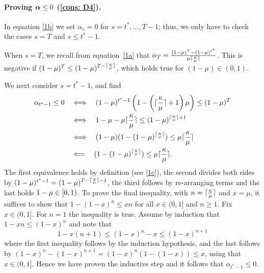 \paragraph{Proving $\bm{\alpha} \leq 0$ (\ref{cons: D4}).}
In  equation \eqref{1b} we set $\alpha_s = 0$ for $s = t^*, \ldots, T-1$; thus, we only have to check the cases $s = T$ and $s\leq t^*-1$. 

When $s=T$, we recall from equation~\eqref{1a} that $\alpha_T =  \frac{ (1-\mu)^T - (1-\mu)^{t^*} }{\mu \lceil \frac{\kappa}{\mu}\rceil}$. This is negative if $(1-\mu)^T \leq (1-\mu)^{T - \lceil \frac{\kappa}{\mu} \rceil}$, which holds true for $(1-\mu)\in(0,1)$.
    
    We next consider $s=t^*-1$, and find %
    \begin{align*}
        \alpha_{t^*-1} \leq 0 \quad &\Longleftrightarrow \quad (1-\mu)^{t^*-1} \left(1 - \left(\lceil \frac{\kappa}{\mu}\rceil+1\right)\mu \right) \leq  (1-\mu)^T\\
        &\Longleftrightarrow \quad 1-\mu - \mu\lceil \frac{\kappa}{\mu} \rceil \leq (1-\mu)^{\lceil \frac{\kappa}{\mu} \rceil +1}\\
        &\Longleftrightarrow \quad (1-\mu) (1- (1-\mu)^{\lceil \frac{\kappa}{\mu} \rceil}) \leq \mu\lceil \frac{\kappa}{\mu} \rceil\\
        &\Longleftarrow \quad (1- (1-\mu)^{\lceil \frac{\kappa}{\mu} \rceil}) \leq \mu\lceil \frac{\kappa}{\mu} \rceil.
    \end{align*}
    The first equivalence holds by definition (see \eqref{1c}), the second divides both sides by $(1-\mu)^{t^*-1} = (1-\mu)^{T - \lceil \frac{\kappa}{\mu} \rceil -1}$, the third follows by re-arranging terms and the last holds $1-\mu \in [0, 1)$.  To prove the final inequality, with $n=\lceil \frac{\kappa}{\mu} \rceil$ and $x=\mu$,  it suffices to show that $1-(1-x)^n \leq xn$ for all $x \in (0,1]$ and $n \geq 1$. Fix $x \in (0,1]$. For $n = 1$ the inequality is true. Assume by induction that $1-xn\leq (1-x)^n$ and note that
    \begin{equation*}
        1-x(n+1) \leq (1-x)^n - x \leq (1-x)^{n+1}
    \end{equation*}
    where the first inequality follows by the induction hypothesis, and the last follows by $(1-x)^n - (1-x)^{n+1} = (1-x)^n (1 - (1-x)) \leq x$, using that $x \in (0,1]$. Hence we have proven the inductive step and it follows that $\alpha_{t^*-1} \leq 0$.
    
